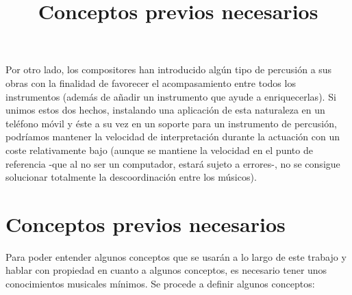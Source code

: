 Por otro lado, los compositores han introducido algún tipo de percusión a sus obras con la finalidad de favorecer
el acompasamiento entre todos los instrumentos (además de añadir un instrumento que ayude a enriquecerlas). Si
unimos estos dos hechos, instalando una aplicación de esta naturaleza en un teléfono móvil y éste a su vez en un
soporte para un instrumento de percusión, podríamos mantener la velocidad de interpretación durante la actuación con
un coste relativamente bajo (aunque se mantiene la velocidad en el punto de referencia -que al no ser un computador,
estará sujeto a errores-, no se consigue solucionar totalmente la descoordinación entre los músicos).\\


\title{Conceptos previos necesarios}
\section{Conceptos previos necesarios}
Para poder entender algunos conceptos que se usarán a lo largo de este trabajo y hablar con propiedad en cuanto a
algunos conceptos, es necesario tener unos conocimientos musicales mínimos. Se procede a definir algunos conceptos:

